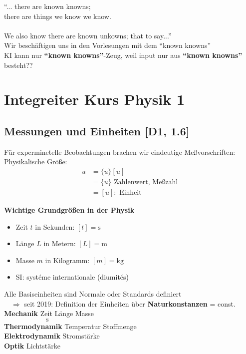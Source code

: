 \documentclass{gadsescript}
\begin{document}
``... there are known knowns;\\there are things we know we know.\\~\\We also know there are known unkowns; that to say...''\\
Wir beschäftigen uns in den Vorlesungen mit dem ``known knowns''\\
\indent\quad KI kann nur \textbf{``known knowns''}-Zeug, weil input nur aus \textbf{``known knowns''} besteht??

\section{Integreiter Kurs Physik 1}
\subsection{Messungen und Einheiten [D1, 1.6]}
Für experminetelle Beobachtungen brachen wir eindeutige Meßvorschriften:\\
Physikalische Größe:
\begin{align*}
	u &= \{u\}[u]\\
	~&= \{u\} \text{ Zahlenwert, Meßzahl}\\
	~&= [u]: \text{ Einheit}
\end{align*}

\textbf{Wichtige Grundgrößen in der Physik}
\begin{itemize}
	\item Zeit $t$ in Sekunden: $[t] = \unit{\second}$
	\item Länge $L$ in Metern: $[L] = \unit{\metre}$
	\item Masse $m$ in Kilogramm: $[m] = \unit{\kilogram}$
	\item SI: systéme internationale (diumités)
\end{itemize}
Alle Basiseinheiten sind Normale oder Standards definiert\\
\indent$\quad\Rightarrow$ seit 2019: Definition der Einheiten über \textbf{Naturkonstanzen} = const.\\

\textbf{Mechanik}	\quad Zeit		\quad Länge	\quad Masse\\
\indent$\qquad\qquad\qquad\unit{\second}$\\
\textbf{Thermodynamik}	\quad Temperatur	\quad Stoffmenge\\
\textbf{Elektrodynamik}	\quad Stromstärke\\
\textbf{Optik}		\quad Lichtstärke
\end{document}
